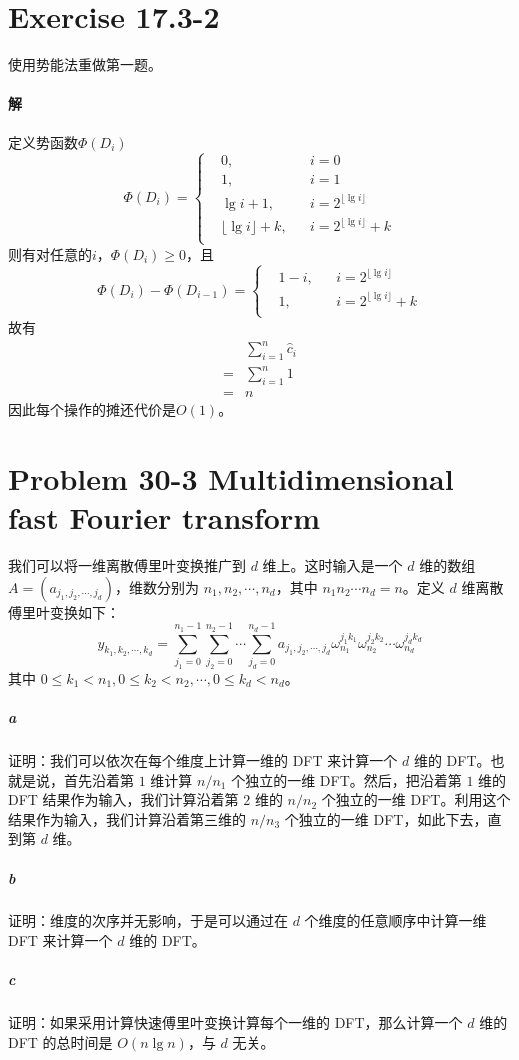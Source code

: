 \documentclass{article}
\begin{document}
\section{Exercise 17.3-2}
使用势能法重做第一题。

\paragraph{解}
定义势函数$\Phi(D_i)$
\begin{equation*}
	\Phi(D_i) = \left\{
	\begin{aligned}
		&0, &&i = 0 \\
		&1, &&i = 1 \\
		&\lg{i} + 1, &&i = 2^{\lfloor \lg{i} \rfloor} \\
		&\lfloor \lg{i} \rfloor + k, &&i = 2^{\lfloor \lg{i} \rfloor} + k \\
	\end{aligned}
	\right.
\end{equation*}
则有对任意的$i$，$\Phi(D_i) \geq 0$，且
\begin{equation*}
	\Phi(D_i) - \Phi(D_{i - 1}) = \left\{
	\begin{aligned}
		&1 - i, &&i = 2^{\lfloor \lg{i} \rfloor} \\
		&1, &&i = 2^{\lfloor \lg{i} \rfloor} + k \\
	\end{aligned}
	\right.
\end{equation*}
故有
\begin{align*}
	&\sum_{i = 1}^{n}{ \hat{c}_i } \\
	=&\sum_{i = 1}^{n}{1} \\
	=&n
\end{align*}
因此每个操作的摊还代价是$O(1)$。

\section{Problem 30-3 Multidimensional fast Fourier transform}
我们可以将一维离散傅里叶变换推广到 $d$ 维上。这时输入是一个 $d$ 维的数组 $A = (a_{j_1,j_2,\cdots,j_d})$，维数分别为 $n_1,n_2,\cdots,n_d$，其中 $n_1 n_2 \cdots n_d = n$。定义 $d$ 维离散傅里叶变换如下：
\begin{equation*}
	y_{k_1, k_2, \cdots, k_d} = \sum_{j_1 = 0}^{n_1 - 1}\sum_{j_2 = 0}^{n_2 - 1} \cdots \sum_{j_d = 0}^{n_d - 1}{a_{j_1,j_2,\cdots,j_d} \omega_{n_1}^{j_1 k_1}\omega_{n_2}^{j_2 k_2} \cdots \omega_{n_d}^{j_d k_d}}
\end{equation*}
其中 $0 \leq k_1 < n_1,0 \leq k_2 < n_2, \cdots ,0 \leq k_d < n_d$。
\subparagraph{a}证明：我们可以依次在每个维度上计算一维的 DFT 来计算一个 $d$ 维的 DFT。也就是说，首先沿着第 $1$ 维计算 $n / n_1$ 个独立的一维 DFT。然后，把沿着第 $1$ 维的 DFT 结果作为输入，我们计算沿着第 $2$ 维的 $n / n_2$ 个独立的一维 DFT。利用这个结果作为输入，我们计算沿着第三维的 $n / n_3$ 个独立的一维 DFT，如此下去，直到第 $d$ 维。
\subparagraph{b}证明：维度的次序并无影响，于是可以通过在 $d$ 个维度的任意顺序中计算一维 DFT 来计算一个 $d$ 维的 DFT。
\subparagraph{c}证明：如果采用计算快速傅里叶变换计算每个一维的 DFT，那么计算一个 $d$ 维的 DFT 的总时间是 $O(n\lg{n})$，与 $d$ 无关。
\end{document}
